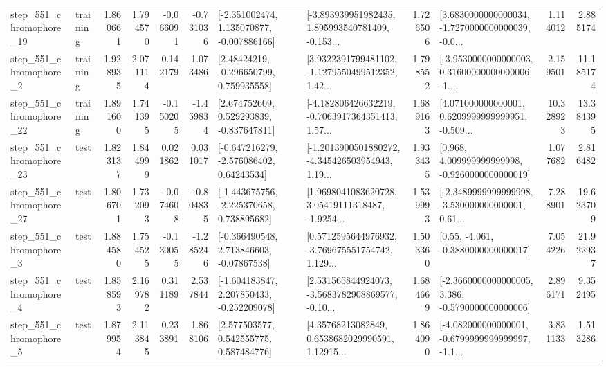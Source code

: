 \begin{tabular}{llrrrrllrlrr}
  step\_551\_chromophore\_19 &  training &      1.860661 &    1.794570 &     -0.066091 & -0.731036 &   [-2.351002474, 1.135070877, -0.007886166] &  [-3.893939951982435, 1.895993540781409, -0.153... &       1.726506 &  [3.6830000000000034, -1.7270000000000039, -0.0... &            1.114012 &          2.885174 \\
   step\_551\_chromophore\_2 &  training &      1.928935 &    2.071114 &      0.142179 &  1.073486 &     [2.48424219, -0.296650799, 0.759935558] &  [3.9322391799481102, -1.1279550499512352, 1.42... &       1.798552 &  [-3.9530000000000003, 0.31600000000000006, -1.... &            2.159501 &         11.185174 \\
  step\_551\_chromophore\_22 &  training &      1.891600 &    1.741395 &     -0.150205 & -1.459834 &    [2.674752609, 0.529293839, -0.837647811] &  [-4.182806426632219, -0.7063917364351413, 1.57... &       1.689163 &  [4.071000000000001, 0.6209999999999951, -0.509... &           10.328923 &         13.384395 \\
  step\_551\_chromophore\_23 &      test &      1.823137 &    1.844999 &      0.021862 &  0.031017 &    [-0.647216279, -2.576086402, 0.64243534] &  [-1.2013900501880272, -4.345426503954943, 1.19... &       1.933435 &    [0.968, 4.009999999999998, -0.9260000000000019] &            1.077682 &          2.816482 \\
  step\_551\_chromophore\_27 &      test &      1.806701 &    1.732093 &     -0.074608 & -0.804835 &   [-1.443675756, -2.225370658, 0.738895682] &  [1.9698041083620728, 3.05419111318487, -1.9254... &       1.539993 &  [-2.3489999999999998, -3.530000000000001, 0.61... &            7.288901 &         19.623709 \\
   step\_551\_chromophore\_3 &      test &      1.884580 &    1.754525 &     -0.130055 & -1.285246 &    [-0.366490548, 2.713846603, -0.07867538] &  [0.5712595644976932, -3.769675551754742, 1.129... &       1.503360 &                [0.55, -4.061, -0.3880000000000017] &            7.054226 &         21.922937 \\
   step\_551\_chromophore\_4 &      test &      1.858593 &    2.169782 &      0.311189 &  2.537844 &   [-1.604183847, 2.207850433, -0.252209078] &  [2.531565844924073, -3.5683782908869577, -0.10... &       1.684669 &  [-2.3660000000000005, 3.386, -0.5790000000000006] &            2.896171 &          9.352495 \\
   step\_551\_chromophore\_5 &      test &      1.879954 &    2.113845 &      0.233891 &  1.868106 &     [2.577503577, 0.542555775, 0.587484776] &  [4.35768213082849, 0.6538682029990591, 1.12915... &       1.864090 &  [-4.082000000000001, -0.6799999999999997, -1.1... &            3.831133 &          1.513286 \\

\end{tabular}
